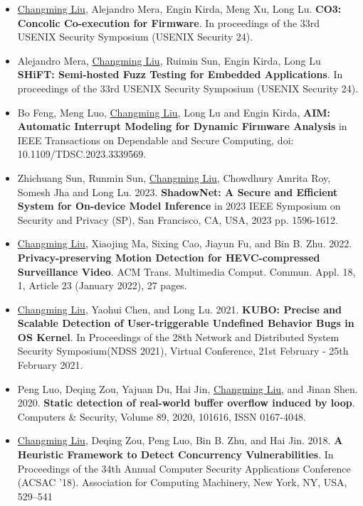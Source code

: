 \documentclass[letterpaper,onecolumn,10pt]{article}
\begin{document}
\begin{itemize}
	\item \underline{Changming Liu}, Alejandro Mera, Engin Kirda, Meng Xu, Long Lu.  {\bf CO3: Concolic Co-execution for Firmware}. In proceedings of the 33rd USENIX Security Symposium (USENIX Security 24). 
	
	\item Alejandro Mera, \underline{Changming Liu}, Ruimin Sun, Engin Kirda, Long Lu  {\bf SHiFT: Semi-hosted Fuzz Testing for Embedded Applications}. In proceedings of the 33rd USENIX Security Symposium (USENIX Security 24). 

	\item Bo Feng, Meng Luo, \underline{Changming Liu}, Long Lu and Engin Kirda, {\bf AIM: Automatic Interrupt Modeling for Dynamic Firmware Analysis} in IEEE Transactions on Dependable and Secure Computing, doi: 10.1109/TDSC.2023.3339569.

	\item Zhichuang Sun, Runmin Sun, \underline{Changming Liu}, Chowdhury Amrita Roy, Somesh Jha and Long Lu. 2023. {\bf ShadowNet: A Secure and Efficient System for On-device Model Inference} in 2023 IEEE Symposium on Security and Privacy (SP), San Francisco, CA, USA, 2023 pp. 1596-1612.

	\item \underline{Changming Liu}, Xiaojing Ma, Sixing Cao, Jiayun Fu, and Bin B. Zhu. 2022. {\bf Privacy-preserving Motion Detection for HEVC-compressed Surveillance Video}. 
	ACM Trans. Multimedia Comput. Commun. Appl. 18, 1, Article 23 (January 2022), 27 pages.

	\item \underline{Changming Liu}, Yaohui Chen, and Long Lu. 2021. {\bf KUBO: Precise and Scalable Detection of User-triggerable Undefined Behavior Bugs in OS Kernel}. 
	In Proceedings of the 28th Network and Distributed System Security Symposium(NDSS 2021), Virtual Conference, 21st February - 25th February 2021.

	\item Peng Luo, Deqing Zou, Yajuan Du, Hai Jin, \underline{Changming Liu}, and Jinan Shen. 2020. {\bf Static detection of real-world buffer overflow induced by loop}. Computers \& Security, Volume 89, 2020, 101616, ISSN 0167-4048.

	\item \underline{Changming Liu}, Deqing Zou, Peng Luo, Bin B. Zhu, and Hai Jin. 2018. {\bf A Heuristic Framework to Detect Concurrency Vulnerabilities}. In Proceedings of the 34th Annual Computer Security Applications Conference (ACSAC '18). Association for Computing Machinery, New York, NY, USA, 529–541 


\end{itemize}
\end{document}
